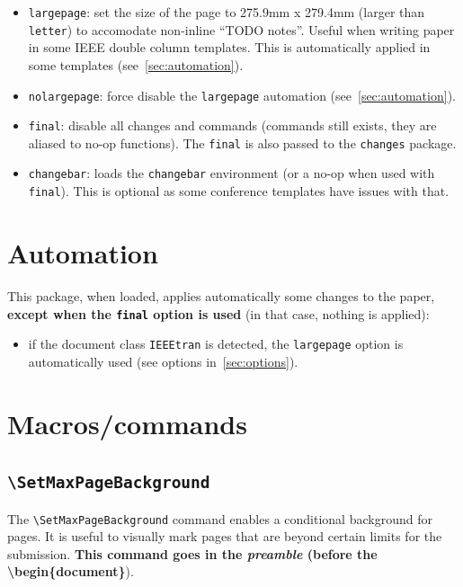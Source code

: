 \documentclass[a4paper]{article}
\newcommand\B[1]{\texttt{\textbackslash #1}}
\begin{document}
\begin{itemize}
    \item \texttt{largepage}: set the size of the page to 275.9mm x 279.4mm (larger than \texttt{letter}) to accomodate non-inline ``TODO notes''. Useful when writing paper in some IEEE double column templates. This is automatically applied in some templates (see~\autoref{sec:automation}).
    \item \texttt{nolargepage}: force disable the \texttt{largepage} automation (see~\autoref{sec:automation}).
    \item \texttt{final}: disable all changes and commands (commands still exists, they are aliased to no-op functions). The \texttt{final} is also passed to the \texttt{changes} package.
    \item \texttt{changebar}: loads the \texttt{changebar} environment (or a no-op when used with \texttt{final}). This is optional as some conference templates have issues with that.
\end{itemize}


\section{Automation}
\label{sec:automation}

This package, when loaded, applies automatically some changes to the paper, \textbf{except when the \texttt{final} option is used} (in that case, nothing is applied):

\begin{itemize}
	\item if the document class \texttt{IEEEtran} is detected, the \texttt{largepage} option is automatically used (see options in~\autoref{sec:options}).
\end{itemize}


\section{Macros/commands}

\subsection{\B{SetMaxPageBackground}}

The \B{SetMaxPageBackground} command enables a conditional background for pages. It is useful to visually mark pages that are beyond certain limits for the submission. \textbf{This command goes in the \textit{preamble} (before the \textbackslash begin\{document\}}).
\end{document}
